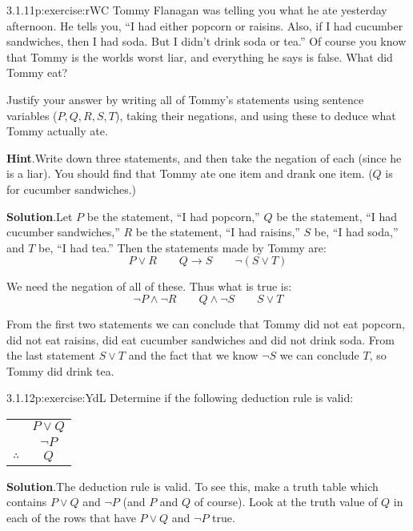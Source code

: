 \documentclass[twoside,11pt,]{book}
\newcommand{\blocktitlefont}{\relax}
\newcommand{\tabularfont}{\relax}
\numberwithin{equation}{chapter}
\newcommand{\hrulethin}  {\noalign{\hrule height 0.04em}}
\newcommand{\imp}{\rightarrow}
\begin{document}
\begin{divisionsolution}{3.1.11}{}{p:exercise:rWC}%
Tommy Flanagan was telling you what he ate yesterday afternoon. He tells you, ``I had either popcorn or raisins. Also, if I had cucumber sandwiches, then I had soda. But I didn't drink soda or tea.'' Of course you know that Tommy is the worlds worst liar, and everything he says is false. What did Tommy eat?%
\par
Justify your answer by writing all of Tommy's statements using sentence variables (\(P, Q, R, S, T\)), taking their negations, and using these to deduce what Tommy actually ate.%
\par\smallskip%
\noindent\textbf{\blocktitlefont Hint}.\quad{}Write down three statements, and then take the negation of each (since he is a liar).  You should find that Tommy ate one item and drank one item.  (\(Q\) is for cucumber sandwiches.)%
\par\smallskip%
\noindent\textbf{\blocktitlefont Solution}.\quad{}Let \(P\) be the statement, ``I had popcorn,'' \(Q\) be the statement, ``I had cucumber sandwiches,'' \(R\) be the statement, ``I had raisins,'' \(S\) be, ``I had soda,'' and \(T\) be, ``I had tea.'' Then the statements made by Tommy are:%
\begin{equation*}
P \vee R \qquad Q \imp S \qquad \neg(S \vee T)
\end{equation*}
%
\par
We need the negation of all of these. Thus what is true is:%
\begin{equation*}
\neg P \wedge \neg R \qquad Q \wedge \neg S \qquad S \vee T
\end{equation*}
%
\par
From the first two statements we can conclude that Tommy did not eat popcorn, did not eat raisins, did eat cucumber sandwiches and did not drink soda. From the last statement \(S \vee T\) and the fact that we know \(\neg S\) we can conclude \(T\), so Tommy did drink tea.%
\end{divisionsolution}%
\begin{divisionsolution}{3.1.12}{}{p:exercise:YdL}%
Determine if the following deduction rule is valid:%
\begin{sidebyside}{1}{0}{0}{0}%
\begin{sbspanel}{1}%
{\centering%
{\tabularfont%
\begin{tabular}{cc}
&\(P \vee Q\)\tabularnewline[0pt]
&\(\neg P\)\tabularnewline\hrulethin
\(\therefore\)&\(Q\)
\end{tabular}
}%
\par}
\end{sbspanel}%
\end{sidebyside}%
\par\smallskip%
\noindent\textbf{\blocktitlefont Solution}.\quad{}The deduction rule is valid. To see this, make a truth table which contains \(P \vee Q\) and \(\neg P\) (and \(P\) and \(Q\) of course). Look at the truth value of \(Q\) in each of the rows that have \(P \vee Q\) and \(\neg P\) true.%
\end{divisionsolution}%
\end{document}
